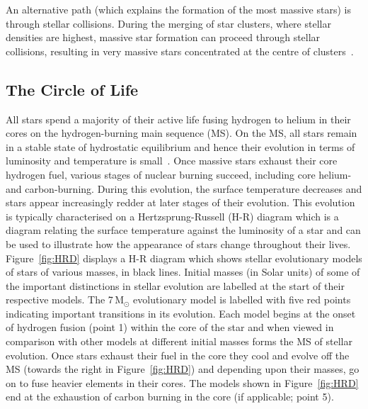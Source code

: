 An alternative path (which explains the formation of the most massive stars) is through stellar collisions.
During the merging of star clusters, where stellar densities are highest, massive star formation can proceed through stellar collisions, resulting in very massive stars concentrated at the centre of clusters~\citep{Fujii13}.



\subsection{The Circle of Life} %
\label{sub:life_cycle}

All stars spend a majority of their active life fusing hydrogen to helium in their cores on the hydrogen-burning main sequence (MS).
On the MS, all stars remain in a stable state of hydrostatic equilibrium and hence their evolution in terms of luminosity and temperature is small~\citep{2012sse..book.....K}.
Once massive stars exhaust their core hydrogen fuel, various stages of nuclear burning succeed, including core helium- and carbon-burning.
During this evolution, the surface temperature decreases and stars appear increasingly redder at later stages of their evolution.
This evolution is typically characterised on a Hertzsprung-Russell (H-R) diagram which is a diagram relating the surface temperature against the luminosity of a star and can be used to illustrate how the appearance of stars change throughout their lives.
Figure~\ref{fig:HRD} displays a H-R diagram which shows stellar evolutionary models of stars of various masses, in black lines.
Initial masses (in Solar units) of some of the important distinctions in stellar evolution are labelled at the start of their respective models.
The 7\,M$_{\odot}$ evolutionary model is labelled with five red points indicating important transitions in its evolution.
Each model begins at the onset of hydrogen fusion (point 1) within the core of the star and when viewed in comparison with other models at different initial masses forms the MS of stellar evolution.
Once stars exhaust their fuel in the core they cool and evolve off the MS (towards the right in Figure~\ref{fig:HRD}) and depending upon their masses, go on to fuse heavier elements in their cores.
The models shown in Figure~\ref{fig:HRD} end at the exhaustion of carbon burning in the core (if applicable; point 5).


